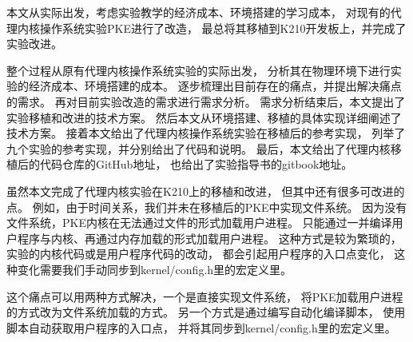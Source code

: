 %
%
%
%
%
%

\renewcommand{\thechapter}{结论}




本文从实际出发，考虑实验教学的经济成本、环境搭建的学习成本，
对现有的代理内核操作系统实验PKE进行了改造，
最总将其移植到K210开发板上，并完成了实验改进。

整个过程从原有代理内核操作系统实验的实际出发，
分析其在物理环境下进行实验的经济成本、环境搭建的成本。
逐步梳理出目前存在的痛点，并提出解决痛点的需求。
再对目前实验改造的需求进行需求分析。
需求分析结束后，本文提出了实验移植和改进的技术方案。
然后本文从环境搭建、移植的具体实现详细阐述了技术方案。
接着本文给出了代理内核操作系统实验在移植后的参考实现，
列举了九个实验的参考实现，并分别给出了代码和说明。
最后，本文给出了代理内核移植后的代码仓库的GitHub地址，
也给出了实验指导书的gitbook地址。

虽然本文完成了代理内核实验在K210上的移植和改进，
但其中还有很多可改进的点。
例如，由于时间关系，我们并未在移植后的PKE中实现文件系统。
因为没有文件系统，PKE内核在无法通过文件的形式加载用户进程。
只能通过一并编译用户程序与内核、再通过内存加载的形式加载用户进程。
这种方式是较为繁琐的，实验的内核代码或是用户程序代码的改动，
都会引起用户程序的入口点变化，
这种变化需要我们手动同步到kernel/config.h里的宏定义里。

这个痛点可以用两种方式解决，一个是直接实现文件系统，
将PKE加载用户进程的方式改为文件系统加载的方式。
另一个方式是通过编写自动化编译脚本，
使用脚本自动获取用户程序的入口点，
并将其同步到kernel/config.h里的宏定义里。
